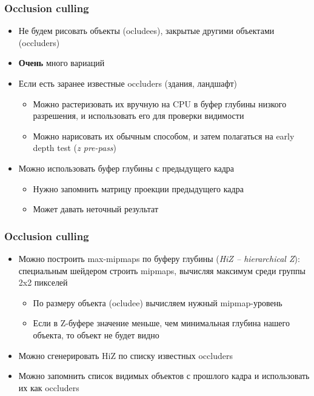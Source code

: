 \documentclass{beamer}
\begin{document}
\begin{frame}[fragile]
\frametitle{Occlusion culling}
\begin{itemize}
\item Не будем рисовать объекты (ocludees), закрытые другими объектами (occluders)
\pause
\item \textbf{Очень} много вариаций
\pause
\item Если есть заранее известные occluders (здания, ландшафт)
\pause
\begin{itemize}
\item Можно растеризовать их вручную на CPU в буфер глубины низкого разрешения, и использовать его для проверки видимости
\pause
\item Можно нарисовать их обычным способом, и затем полагаться на early depth test (\textit{z pre-pass})
\end{itemize}
\pause
\item Можно использовать буфер глубины с предыдущего кадра
\pause
\begin{itemize}
\item Нужно запомнить матрицу проекции предыдущего кадра
\pause
\item Может давать неточный результат
\end{itemize}
\end{itemize}
\end{frame}

\begin{frame}[fragile]
\frametitle{Occlusion culling}
\begin{itemize}
\item Можно построить max-mipmaps по буферу глубины (\textit{HiZ -- hierarchical Z}): специальным шейдером строить mipmaps, вычисляя максимум среди группы 2x2 пикселей
\pause
\begin{itemize}
\item По размеру объекта (ocludee) вычисляем нужный mipmap-уровень
\pause
\item Если в Z-буфере значение меньше, чем минимальная глубина нашего объекта, то объект не будет видно
\end{itemize}
\pause
\item Можно сгенерировать HiZ по списку известных occluders
\pause
\item Можно запомнить список видимых объектов с прошлого кадра и использовать их как occluders
\end{itemize}
\end{frame}
\end{document}
